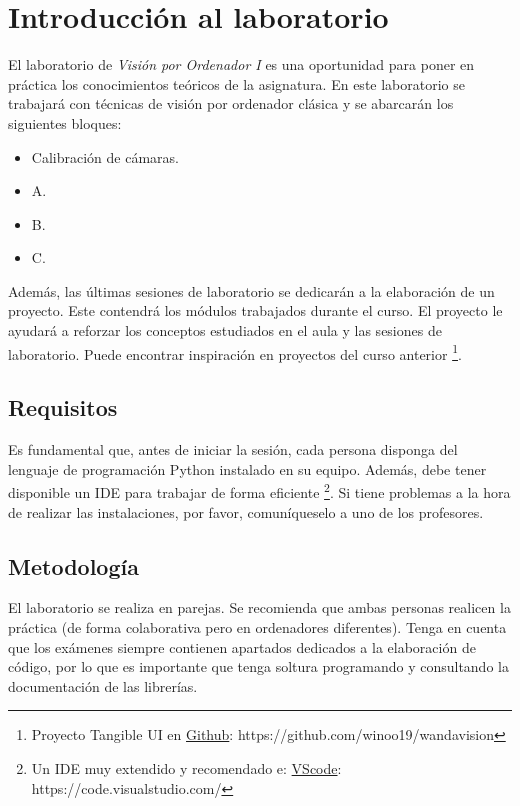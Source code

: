 \chapter{Introducción al laboratorio}
\label{chapter:introduction_lab}

El laboratorio de \textit{Visión por Ordenador I} es una oportunidad para poner en práctica los conocimientos teóricos de la asignatura. En este laboratorio se trabajará con técnicas de visión por ordenador clásica y se abarcarán los siguientes bloques: 

\begin{itemize}
    \item Calibración de cámaras.
    \item A.
    \item B.
    \item C.
\end{itemize}

Además, las últimas sesiones de laboratorio se dedicarán a la elaboración de un proyecto. Este contendrá los módulos trabajados durante el curso. El proyecto le ayudará a reforzar los conceptos estudiados en el aula y las sesiones de laboratorio. Puede encontrar inspiración en proyectos del curso anterior \footnote{Proyecto Tangible UI en \href{https://github.com/winoo19/wandavision}{Github}: https://github.com/winoo19/wandavision}.


\section{Requisitos}
Es fundamental que, antes de iniciar la sesión, cada persona disponga del lenguaje de programación Python instalado en su equipo. Además, debe tener disponible un IDE para trabajar de forma eficiente \footnote{Un IDE muy extendido y recomendado e: \href{https://code.visualstudio.com/}{VScode}: https://code.visualstudio.com/}. Si tiene problemas a la hora de realizar las instalaciones, por favor, comuníqueselo a uno de los profesores.

\section{Metodología}
El laboratorio se realiza en parejas. Se recomienda que ambas personas realicen la práctica (de forma colaborativa pero en ordenadores diferentes). Tenga en cuenta que los exámenes siempre contienen apartados dedicados a la elaboración de código, por lo que es importante que tenga soltura programando y consultando la documentación de las librerías. 


